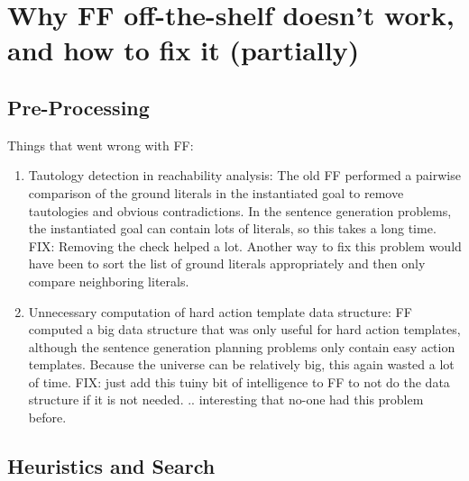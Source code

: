 

\section{Why FF off-the-shelf doesn't work, and how to fix it (partially)}
\label{sec:crisp-ff}




\subsection{Pre-Processing}
\label{sec:crisp-ff:preprocess}





Things that went wrong with FF:

\begin{enumerate}
\item Tautology detection in reachability analysis: The old FF
  performed a pairwise comparison of the ground literals in the
  instantiated goal to remove tautologies and obvious contradictions.
  In the sentence generation problems, the instantiated goal can
  contain lots of literals, so this takes a long time.  FIX: Removing
  the check helped a lot.  Another way to fix this problem would have
  been to sort the list of ground literals appropriately and then only
  compare neighboring literals.
\item Unnecessary computation of hard action template data structure:
  FF computed a big data structure that was only useful for hard
  action templates, although the sentence generation planning problems
  only contain easy action templates.  Because the universe can be
  relatively big, this again wasted a lot of time. FIX: just add this
  tuiny bit of intelligence to FF to not do the data structure if it
  is not needed. .. interesting that no-one had this problem before.
\end{enumerate}







\subsection{Heuristics and Search}
\label{sec:crisp-ff:preprocess:heuristics}






